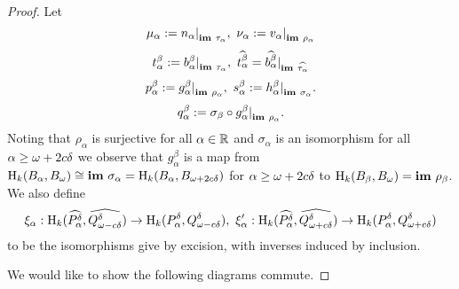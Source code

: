 \begin{proof}
  Let
  \[ \mu_\alpha := n_\alpha\mathord{\mid}_{\mathbf{im}~\tau_\alpha},\ \nu_\alpha := v_\alpha\mathord{\mid}_{\mathbf{im}~\rho_\alpha}\]
  \[ t_\alpha^\beta := b_\alpha^\beta\mathord{\mid}_{\mathbf{im}~\tau_\alpha},\ \widehat{t_\alpha^\beta} = \widehat{b_\alpha^\beta}\mathord{\mid}_{\mathbf{im}~\widehat{\tau_\alpha}}\]
  \[ p_\alpha^\beta := g_\alpha^\beta\mathord{\mid}_{\mathbf{im}~\rho_\alpha},\ s_\alpha^\beta := h_\alpha^\beta\mathord{\mid}_{\mathbf{im}~\sigma_\alpha}.\]
  \[q_\alpha^\beta := \sigma_\beta\circ g_\alpha^\beta\mathord{\mid}_{\mathbf{im}~\rho_\alpha}.\] %
  Noting that $\rho_\alpha$ is surjective for all $\alpha\in\mathbb{R}$ and $\sigma_\alpha$ is an isomorphism for all $\alpha\geq\omega+2c{\delta}$ we observe that $g_\alpha^\beta$ is a map from
  $\mathrm{H}_k(B_\alpha, B_{\omega})\cong \mathbf{im}~\sigma_\alpha = \mathrm{H}_k(B_\alpha, B_{\omega + 2c{\delta}})$ for $\alpha\geq\omega+2c{\delta}$ to $\mathrm{H}_k(B_\beta, B_{\omega})= \mathbf{im}~\rho_\beta$.
  We also define
  \[ \xi_\alpha : \hom_k(\ext{\P_\alpha}, \ext{\Q^\of})\to \hom_k(\P_\alpha, \Q^\of),\ \xi_\alpha' : \hom_k(\ext{\P_\alpha}, \ext{\QQ^\of})\to \hom_k(\P_\alpha, \QQ^\of)\]
  to be the isomorphisms give by excision, with inverses induced by inclusion.

  We would like to show the following diagrams commute.


\end{proof}
